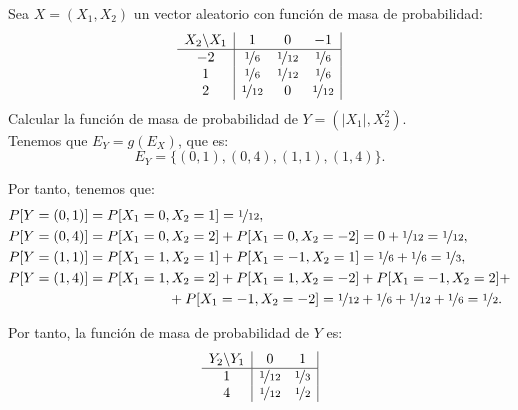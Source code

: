 \begin{ejemplo}
    Sea $X=(X_1,X_2)$ un vector aleatorio con función de masa de probabilidad:
    \begin{equation*}
        \begin{array}{c|ccc|}
            X_2\backslash X_1 & 1 & 0 & -1\\
            \hline
            -2 & \nicefrac{1}{6} & \nicefrac{1}{12} & \nicefrac{1}{6}\\
            1 & \nicefrac{1}{6} & \nicefrac{1}{12} & \nicefrac{1}{6}\\
            2 & \nicefrac{1}{12} & 0 & \nicefrac{1}{12}
        \end{array}
    \end{equation*}
    Calcular la función de masa de probabilidad de $Y=(|X_1|, X_2^2)$.\\

    Tenemos que $E_Y=g(E_X)$, que es:
    \begin{equation*}
        E_Y=\{(0,1),(0,4),(1,1),(1,4)\}.
    \end{equation*}

    Por tanto, tenemos que:
    \begin{align*}
        P[Y=(0,1)] &= P[X_1=0, X_2=1] = \nicefrac{1}{12},\\
        P[Y=(0,4)] &= P[X_1=0, X_2=2]+P[X_1=0, X_2=-2] = 0+\nicefrac{1}{12}= \nicefrac{1}{12},\\
        P[Y=(1,1)] &= P[X_1=1, X_2=1]+P[X_1=-1, X_2=1] = \nicefrac{1}{6}+\nicefrac{1}{6}= \nicefrac{1}{3},\\
        P[Y=(1,4)] &= P[X_1=1, X_2=2]+P[X_1=1, X_2=-2]
        + P[X_1=-1, X_2=2]+\\&\hspace{2cm} +P[X_1=-1, X_2=-2] = \nicefrac{1}{12}+\nicefrac{1}{6}+\nicefrac{1}{12}+\nicefrac{1}{6} = \nicefrac{1}{2}.
    \end{align*}

    Por tanto, la función de masa de probabilidad de $Y$ es:
    \begin{equation*}
        \begin{array}{c|cc|}
            Y_2\backslash Y_1 & 0 & 1\\
            \hline
            1 & \nicefrac{1}{12} & \nicefrac{1}{3}\\
            4 & \nicefrac{1}{12} & \nicefrac{1}{2}
        \end{array}
    \end{equation*}
\end{ejemplo}

